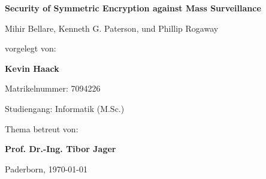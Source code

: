 \begin{titlepage}
\begin{centering}
\vspace*{\fill}

\vspace{3cm} 

\textbf { \LARGE
Security of Symmetric Encryption against Mass Surveillance
\\[1.2cm]
}

{\large
Mihir Bellare, Kenneth G. Paterson, und Phillip Rogaway
\\[2cm]
}

{\large
vorgelegt von:
}

\textbf { \Large
Kevin Haack\\[1cm]
}

{\large
Matrikelnummer: 7094226
\\[2mm]
}

{\large
Studiengang: Informatik (M.Sc.)\\[1cm]
}
    
{\large
Thema betreut von:
}

\textbf { \Large
Prof. Dr.-Ing. Tibor Jager
\\[1cm]
}

{\large
Paderborn, \today
}
\vfill
\end{centering}
\end{titlepage}